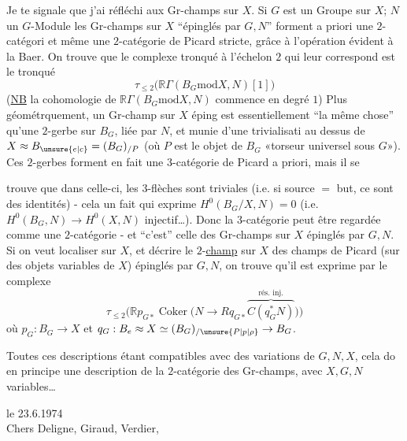 

Je te signale que j'ai réfléchi aux Gr-champs sur $X$. Si $G$ est un Groupe sur $X$; $N$ un $G$-Module les Gr-champs sur $X$ ``épinglés par $G,N$'' forment a priori une $2$-catégori et même une $2$-catégorie de Picard stricte, grâce à l'opération évident à la Baer. On trouve que le complexe  tronqué à l'échelon $2$ qui leur correspond est le tronqué
\[
\tau_{\leq 2}\bigl(\mathbb R\Gamma(B_{G}\mathbin{\mathrm{mod}}X,N)[1]\bigr)
\]
(\uline{NB} la cohomologie de $\mathbb R\Gamma(B_{G}\mathbin{\mathrm{mod}}X,N)$ commence en degré $1$) Plus géométrquement, un Gr-champ sur $X$ éping  est essentiellement ``la même chose'' qu'une $2$-gerbe sur $B_{G}$, liée par $N$, et munie d'une trivialisati au dessus de $X\approx B_{\unsure{e|c}}=(B_{G})_{/P}$ (où $P$ est le objet de $B_{G}$ «torseur universel sous $G$»). Ces $2$-gerbes forment en fait une $3$-catégorie de Picard a priori, mais il se

trouve que dans celle-ci, les $3$-flèches sont triviales (i.e. si source $=$ but, ce sont des identités) - cela un fait qui exprime $H^{0}(B_{G}/X,N)=0$ (i.e. $H^{0}(B_{G},N)\to H^{0}(X,N)$ injectif\ldots). Donc la $3$-catégorie peut être regardée comme une $2$-catégorie - et ``c'est'' celle des Gr-champs sur $X$ épinglés par $G,N$. Si on veut localiser sur $X$, et décrire le $2$-\uline{champ}  sur $X$ des champs de Picard (sur des objets variables de $X$) épinglés par $G,N$, on trouve qu'il est exprime par le complexe
\[
\tau_{\leq 2}\bigl(\mathbb{R}p_{G*}\operatorname{Coker}\bigl(N\to Rq_{G*}\overbrace{C(q_{G}^{*}N)}^{\text{rés. inj.}}\bigr)\bigr)
\]
où $p_{G}:B_{G}\to X$ et $q_{G}:B_{e}\approx X\simeq(B_{G})_{/\unsure{P|p|\rho}}\to B_{G}$.

Toutes ces descriptions étant compatibles avec des variations de $G,N,X$, cela do en principe une description de la $2$-catégorie des Gr-champs, avec $X,G,N$ variables\ldots


\noindent\hfill{} le 23.6.1974\\

Chers Deligne, Giraud, Verdier,\\

